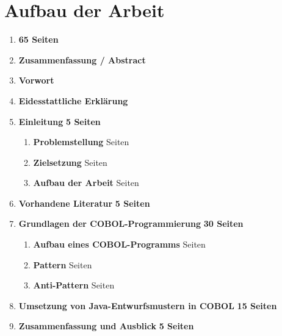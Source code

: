 \section{Aufbau der Arbeit}

\begin{framed}
\begin{enumerate}[label=\arabic*.]
	\item[] \hfill \textbf{65 Seiten}
	\item[] \textbf{Zusammenfassung / Abstract}
    \item[] \textbf{Vorwort}
    \item[] \textbf{Eidesstattliche Erklärung}
	\item 
    	\textbf{Einleitung} \dotfill \textbf{5 Seiten}
    	\begin{enumerate}[label=\arabic*.]
    		\item \textbf{Problemstellung}  Seiten
        	\item \textbf{Zielsetzung}  Seiten
            \item \textbf{Aufbau der Arbeit}  Seiten
    	\end{enumerate}
    \item \textbf{Vorhandene Literatur} \dotfill \textbf{5 Seiten}
    \item \textbf{Grundlagen der COBOL-Programmierung} \dotfill \textbf{30 Seiten}
    	\begin{enumerate}[label=\arabic*.]
    	\item \textbf{Aufbau eines COBOL-Programms}  Seiten
        \item \textbf{Pattern}  Seiten
        \item \textbf{Anti-Pattern}  Seiten
    	\end{enumerate}
    \item \textbf{Umsetzung von Java-Entwurfsmustern in COBOL} \dotfill \textbf{15 Seiten}
    \item \textbf{Zusammenfassung und Ausblick} \dotfill \textbf{5 Seiten}
\end{enumerate}
\end{framed}